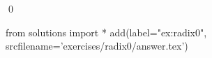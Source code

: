 
\begin{ex} 
  \label{ex:radix0}
  
  \qed
\end{ex} 
\begin{python0}
from solutions import *
add(label="ex:radix0",
    srcfilename='exercises/radix0/answer.tex') 
\end{python0}
